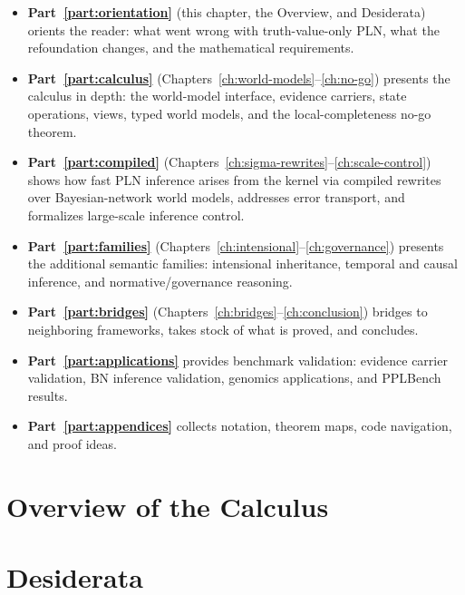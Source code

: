 \documentclass[11pt,openany]{report}
\begin{document}
\begin{itemize}
\item \textbf{Part~\ref{part:orientation}} (this chapter, the
  Overview, and Desiderata) orients the reader: what went wrong with
  truth-value-only PLN, what the refoundation changes, and the
  mathematical requirements.

\item \textbf{Part~\ref{part:calculus}}
  (Chapters~\ref{ch:world-models}--\ref{ch:no-go}) presents the
  calculus in depth: the world-model interface, evidence carriers,
  state operations, views, typed world models, and the
  local-completeness no-go theorem.

\item \textbf{Part~\ref{part:compiled}} (Chapters~\ref{ch:sigma-rewrites}--\ref{ch:scale-control})
  shows how fast PLN inference arises from the kernel via compiled
  rewrites over Bayesian-network world models, addresses error
  transport, and formalizes large-scale inference control.

\item \textbf{Part~\ref{part:families}}
  (Chapters~\ref{ch:intensional}--\ref{ch:governance}) presents the
  additional semantic families: intensional inheritance, temporal and
  causal inference, and normative/governance reasoning.

\item \textbf{Part~\ref{part:bridges}}
  (Chapters~\ref{ch:bridges}--\ref{ch:conclusion}) bridges to
  neighboring frameworks, takes stock of what is proved, and concludes.

\item \textbf{Part~\ref{part:applications}} provides benchmark
  validation: evidence carrier validation, BN inference validation,
  genomics applications, and PPLBench results.

\item \textbf{Part~\ref{part:appendices}} collects notation, theorem
  maps, code navigation, and proof ideas.
\end{itemize}

\chapter{Overview of the Calculus}
\label{ch:overview}



\chapter{Desiderata}
\label{ch:desiderata}
\end{document}
